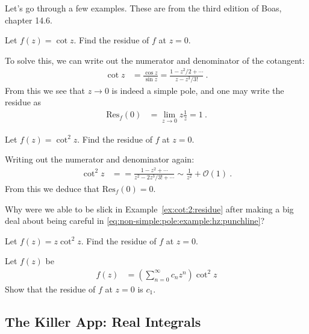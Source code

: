 
Let's go through a few examples. These are from the third edition of Boas, chapter 14.6. 

\begin{example}
Let $f(z)=\cot z$. Find the residue of $f$ at $z=0$. 

To solve this, we can write out the numerator and denominator of the cotangent:
\begin{align}
	\cot z &= \frac{\cos z}{\sin z}
	= \frac{1-z^2/2 + \cdots}{z - z^3/3!} \ .
\end{align}
From this we see that $z\to 0$ is indeed a simple pole, and one may write the residue as
\begin{align}
	\text{Res}_f(0) &= \lim_{z\to 0} z \frac{1}{z} = 1 \ .
\end{align}
\end{example}


\begin{example}\label{ex:cot:2:residue}
Let $f(z)=\cot^2 z$. Find the residue of $f$ at $z=0$. 

Writing out the numerator and denominator again:
\begin{align}
	\cot^2 z &= 
	= \frac{1-z^2 + \cdots}{z^2 - 2z^3/3! + \cdots} 
	\sim \frac{1}{z^2} + \mathcal O(1)
	\ .
\end{align}
From this we deduce that $\text{Res}_f(0) = 0$. 
\end{example}

\begin{exercise}
Why were we able to be slick in Example~\eqref{ex:cot:2:residue} after making a big deal about being careful in \eqref{eq:non-simple:pole:example:hz:punchline}?
\end{exercise}

\begin{exercise}
Let $f(z)=z\cot^2 z$. Find the residue of $f$ at $z=0$. 
\end{exercise}


\begin{exercise}
Let $f(z)$ be
\begin{align}
	f(z) &= \left(\sum_{n=0}^\infty c_n z^n\right)\cot^2 z
\end{align}
Show that the residue of $f$ at $z=0$ is $c_1$.
\end{exercise}


\subsection{The Killer App: Real Integrals}


